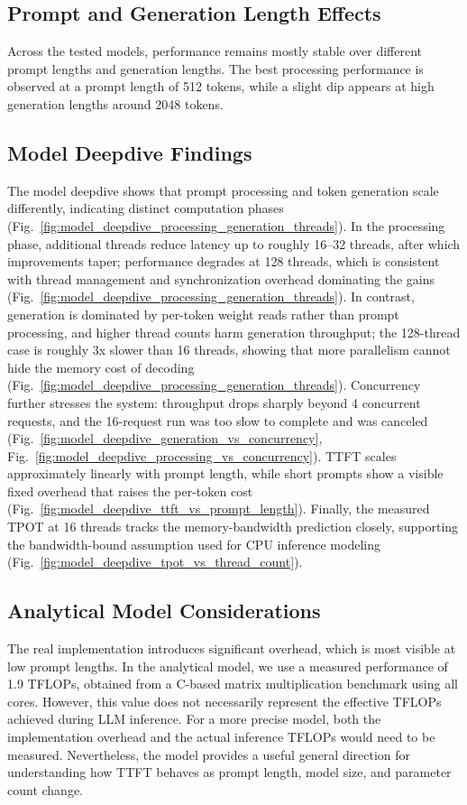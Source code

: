 \documentclass[11pt,a4paper]{article}
\begin{document}
\subsection*{Prompt and Generation Length Effects}
Across the tested models, performance remains mostly stable over different prompt lengths and generation lengths.
The best processing performance is observed at a prompt length of 512 tokens, while a slight dip appears at high generation lengths around 2048 tokens.

\subsection*{Model Deepdive Findings}
The model deepdive shows that prompt processing and token generation scale differently, indicating distinct computation phases (Fig.~\ref{fig:model_deepdive_processing_generation_threads}).
In the processing phase, additional threads reduce latency up to roughly 16--32 threads, after which improvements taper; performance degrades at 128 threads, which is consistent with thread management and synchronization overhead dominating the gains (Fig.~\ref{fig:model_deepdive_processing_generation_threads}).
In contrast, generation is dominated by per-token weight reads rather than prompt processing, and higher thread counts harm generation throughput; the 128-thread case is roughly 3x slower than 16 threads, showing that more parallelism cannot hide the memory cost of decoding (Fig.~\ref{fig:model_deepdive_processing_generation_threads}).
Concurrency further stresses the system: throughput drops sharply beyond 4 concurrent requests, and the 16-request run was too slow to complete and was canceled (Fig.~\ref{fig:model_deepdive_generation_vs_concurrency}, Fig.~\ref{fig:model_deepdive_processing_vs_concurrency}).
TTFT scales approximately linearly with prompt length, while short prompts show a visible fixed overhead that raises the per-token cost (Fig.~\ref{fig:model_deepdive_ttft_vs_prompt_length}).
Finally, the measured TPOT at 16 threads tracks the memory-bandwidth prediction closely, supporting the bandwidth-bound assumption used for CPU inference modeling (Fig.~\ref{fig:model_deepdive_tpot_vs_thread_count}).

\subsection*{Analytical Model Considerations}
The real implementation introduces significant overhead, which is most visible at low prompt lengths.
In the analytical model, we use a measured performance of 1.9 TFLOPs, obtained from a C-based matrix multiplication benchmark using all cores.
However, this value does not necessarily represent the effective TFLOPs achieved during LLM inference.
For a more precise model, both the implementation overhead and the actual inference TFLOPs would need to be measured.
Nevertheless, the model provides a useful general direction for understanding how TTFT behaves as prompt length, model size, and parameter count change.
\end{document}
